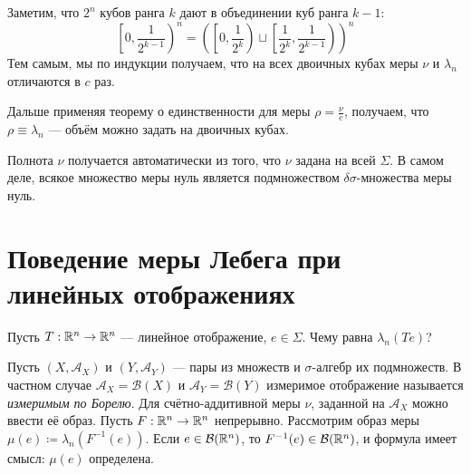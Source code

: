 \documentclass[a4paper]{report}
\begin{document}
{{{            Заметим, что $2^n$ кубов ранга $k$ дают в объединении куб ранга $k - 1$: \[\left[0, \frac1{2^{k-1}}\right)^n = \left(\left[0, \frac{1}{2^{k}}\right) \sqcup \left[\frac1{2^k}, \frac1{2^{k-1}}\right)\right)^n\]
            Тем самым, мы по индукции получаем, что на всех двоичных кубах меры $\nu$ и $\lambda_n$ отличаются в $c$ раз.

            Дальше применяя теорему о единственности для меры $\rho = \frac{\nu}{c}$, получаем, что $\rho \equiv \lambda_n$ --- объём можно задать на двоичных кубах.

            Полнота $\nu$ получается автоматически из того, что $\nu$ задана на всей $\Sigma$.
            В самом деле, всякое множество меры нуль является подмножеством $\delta\sigma$-множества меры нуль.
        }
    }
    }


    \section{Поведение меры Лебега при линейных отображениях}
    Пусть $T: \mathbb{R}^n \rightarrow \mathbb{R}^n$ --- линейное отображение, $e \in \Sigma$.
    Чему равна $\lambda_n(Te)$?

    Пусть $(X, \mathcal{A}_X)$ и $(Y, \mathcal{A}_Y)$ --- пары из множеств и $\sigma$-алгебр их подмножеств.
    В частном случае $\mathcal{A}_X = \mathcal{B}(X)$ и $\mathcal{A}_Y = \mathcal{B}(Y)$ измеримое отображение называется \emph{измеримым по Борелю}.
    Для счётно-аддитивной меры $\nu$, заданной на $\mathcal{A}_X$ можно ввести её образ.
    Пусть $F: \mathbb{R}^n \rightarrow \mathbb{R}^n$ непрерывно.
    Рассмотрим образ меры $\mu(e) \coloneqq \lambda_n(F^{-1}(e))$.
    Если $e \in \mathcal{B}(\mathbb{R}^n)$, то $F^{-1}(e) \in \mathcal{B}(\mathbb{R}^n)$, и формула имеет смысл: $\mu(e)$ определена.
\end{document}
